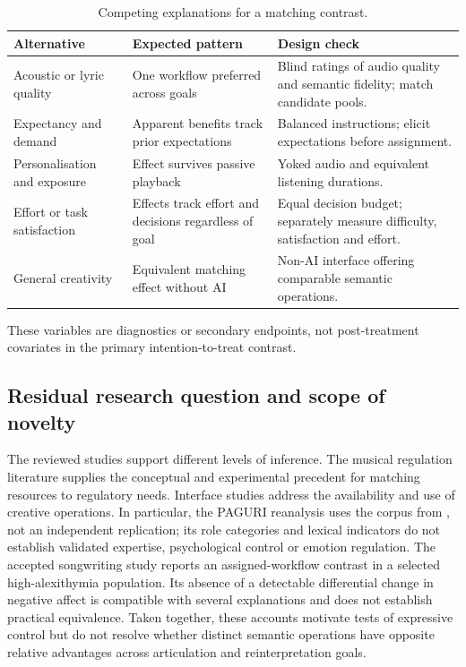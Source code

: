\begin{table}[htbp]
\centering\small
\caption{Competing explanations for a matching contrast.}
\begin{tabularx}{\linewidth}{@{}>{\raggedright\arraybackslash}p{.25\linewidth}>{\raggedright\arraybackslash}X>{\raggedright\arraybackslash}X@{}}
\toprule
Alternative & Expected pattern & Design check \\
\midrule
Acoustic or lyric quality & One workflow preferred across goals & Blind ratings of audio quality and semantic fidelity; match candidate pools.\\
Expectancy and demand & Apparent benefits track prior expectations & Balanced instructions; elicit expectations before assignment.\\
Personalisation and exposure & Effect survives passive playback & Yoked audio and equivalent listening durations.\\
Effort or task satisfaction & Effects track effort and decisions regardless of goal & Equal decision budget; separately measure difficulty, satisfaction and effort.\\
General creativity & Equivalent matching effect without AI & Non-AI interface offering comparable semantic operations.\\
\bottomrule
\end{tabularx}
\end{table}
These variables are diagnostics or secondary endpoints, not post-treatment covariates in the primary intention-to-treat contrast.

\subsection{Residual research question and scope of novelty}
The reviewed studies support different levels of inference. The musical regulation literature supplies the conceptual and experimental precedent for matching resources to regulatory needs. Interface studies address the availability and use of creative operations. In particular, the PAGURI reanalysis \citep{zhangpan2026} uses the corpus from \citet{ronchini2025}, not an independent replication; its role categories and lexical indicators do not establish validated expertise, psychological control or emotion regulation. The accepted songwriting study \citep{zhang2026} reports an assigned-workflow contrast in a selected high-alexithymia population. Its absence of a detectable differential change in negative affect is compatible with several explanations and does not establish practical equivalence. Taken together, these accounts motivate tests of expressive control but do not resolve whether distinct semantic operations have opposite relative advantages across articulation and reinterpretation goals.

